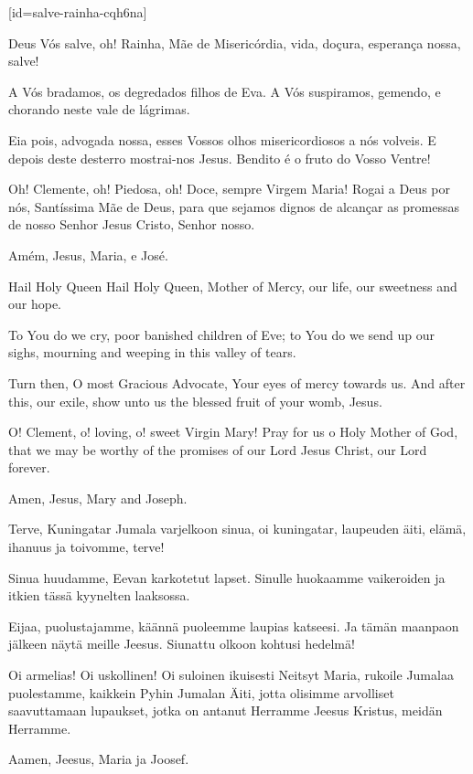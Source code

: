   [id={salve-rainha-cqh6na}]\begin{passage}[PT]{}
    Deus Vós salve, oh! Rainha, Mãe de Misericórdia,
    vida, doçura, esperança nossa, salve!
    \par
    A Vós bradamos, os degredados filhos de Eva.
    A Vós suspiramos, gemendo, e chorando neste
    vale de lágrimas.
    \par
    Eia pois, advogada nossa, esses Vossos olhos
    misericordiosos a nós volveis.
    E depois deste desterro mostrai-nos Jesus.
    Bendito é o fruto do Vosso Ventre!
    \par
    Oh! Clemente, oh! Piedosa, oh! Doce, sempre
    Virgem Maria!
    Rogai a Deus por nós, Santíssima Mãe de Deus,
    para que sejamos dignos de alcançar as promessas
    de nosso Senhor Jesus Cristo, Senhor nosso.
    \par
    Amém, Jesus, Maria, e José.
  \end{passage}
  \hardbrk
  \begin{passage}[EN]{Hail Holy Queen}
    Hail Holy Queen, Mother of Mercy, our life, our
    sweetness and our hope.
    \par
    To You do we cry, poor banished children of Eve;
    to You do we send up our sighs, mourning and
    weeping in this valley of tears.
    \par
    Turn then, O most Gracious Advocate, Your eyes
    of mercy towards us. And after this, our exile, show unto us the
    blessed fruit of your womb, Jesus.
    \par
    O! Clement, o! loving, o! sweet Virgin Mary!
    Pray for us o Holy Mother of God, that we may
    be worthy of the promises of our Lord Jesus Christ,
    our Lord forever.
    \par
    Amen, Jesus, Mary and Joseph.
  \end{passage}
  \begin{passage}[FI]{Terve, Kuningatar}
    Jumala varjelkoon sinua, oi kuningatar, laupeuden äiti, elämä, ihanuus ja toivomme, terve!
    \par
    Sinua huudamme, Eevan karkotetut lapset. Sinulle huokaamme vaikeroiden ja
    itkien tässä kyynelten laaksossa.
    \par
    Eijaa, puolustajamme, käännä puoleemme laupias katseesi. Ja tämän
    maanpaon jälkeen näytä meille Jeesus. Siunattu olkoon kohtusi hedelmä!
    \par
    Oi armelias! Oi uskollinen! Oi suloinen ikuisesti Neitsyt Maria,
    rukoile Jumalaa puolestamme, kaikkein Pyhin Jumalan Äiti, jotta
    olisimme arvolliset saavuttamaan lupaukset, jotka on antanut
    Herramme Jeesus Kristus, meidän Herramme.
    \par
    Aamen, Jeesus, Maria ja Joosef.
  \end{passage}
\endsong



